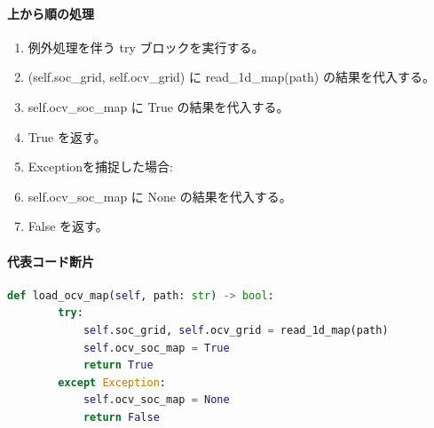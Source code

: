 \documentclass[a4paper,11pt]{article}
\begin{document}
            \paragraph{上から順の処理}
            \begin{enumerate}[leftmargin=1.8em]
            \item 例外処理を伴う try ブロックを実行する。
\item   (self.soc\_grid, self.ocv\_grid) に read\_1d\_map(path) の結果を代入する。
\item   self.ocv\_soc\_map に True の結果を代入する。
\item   True を返す。
\item   Exceptionを捕捉した場合:
\item   self.ocv\_soc\_map に None の結果を代入する。
\item   False を返す。
            \end{enumerate}
            \paragraph{代表コード断片}
            \begin{lstlisting}[language=Python]
    def load_ocv_map(self, path: str) -> bool:
        try:
            self.soc_grid, self.ocv_grid = read_1d_map(path)
            self.ocv_soc_map = True
            return True
        except Exception:
            self.ocv_soc_map = None
            return False
\end{lstlisting}
\end{document}

